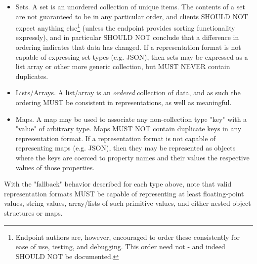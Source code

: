 \begin{itemize}
	\begin{itemize}
		\item Sets. A set is an unordered collection of unique items. The
		contents of a set are not guaranteed to be in any particular order, and
		clients SHOULD NOT expect anything else\footnote{Endpoint authors are,
		however, encouraged to order these consistently for ease of use,
		testing, and debugging. This order need not - and indeed SHOULD NOT be
		documented.} (unless the endpoint provides sorting functionality
		expressly), and in particular SHOULD NOT conclude that a difference in
		ordering indicates that data has changed. If a representation format is
		not capable of expressing set types (e.g. JSON), then sets may be
		expressed as a list array or other more generic collection, but MUST
		NEVER contain duplicates.

		\item Lists/Arrays. A list/array is an \emph{ordered} collection of
		data, and as such the ordering MUST be consistent in representations, as
		well as meaningful.

		\item Maps. A map may be used to associate any non-collection type "key"
		with a "value" of arbitrary type. Maps MUST NOT contain duplicate keys
		in any representation format. If a representation format is not capable
		of representing maps (e.g. JSON), then they may be represented as
		objects where the keys are coerced to property names and their values
		the respective values of those properties.
	\end{itemize}
\end{itemize}

With the "fallback" behavior described for each type above, note that valid
representation formats MUST be capable of representing at least floating-point
values, string values, array/lists of such primitive values, and either nested
object structures or maps.






















